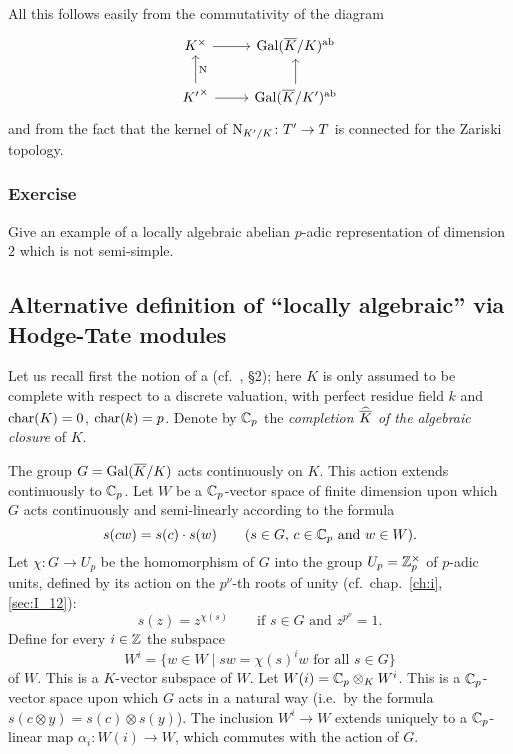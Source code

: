All this follows easily from the commutativity of the diagram
\dpage
\[\begin{tikzcd}
	{K^\times} & {\abcl{\Gal(\algcl K/K)}} \\
	{{K'}^\times} & {\abcl{\Gal(\algcl K/K')}}
	\arrow[from=1-1, to=1-2]
	\arrow["\Nm"', from=2-1, to=1-1]
	\arrow[from=2-1, to=2-2]
	\arrow[from=2-2, to=1-2]
\end{tikzcd}\]
and from the fact that the kernel of $\operatorname{N}_{K'/K} \colon T' \to T$ is connected
for the Zariski topology.

\subsubsection*{Exercise}
Give an example of a locally algebraic abelian $p$-adic representation of
dimension $2$ which is not semi-simple.

\subsection{Alternative definition of ``locally algebraic'' via Hodge-Tate
modules}
\label{sec:III_12}
Let us recall first the notion of a  (cf.\ \cite{27},
\S 2); here $K$ is only assumed to be complete with respect to a discrete
valuation, with perfect residue field $k$ and $\operatorname{char}(K) = 0$, $\operatorname{char}(k) = p$.
Denote by $\mathbb{C}_p$ the \emph{completion $\widehat{\overline{K}}$ of the algebraic
closure} of $K$.

The group $G = \operatorname{Gal}(\overline{K}/K)$ acts continuously on $K$. This action extends
continuously to $\mathbb{C}_p$. Let $W$ be a $\mathbb{C}_p$-vector space of finite dimension upon
which $G$ acts continuously and semi-linearly according to the formula
\[
	s(cw) = s(c) \cdot s(w) \qquad
	(s \in G, \, c \in \mathbb{C}_p \text{ and } w \in W).
\]
Let $\chi\colon G \to U_p$ be the homomorphism of $G$ into the group $U_p =
\mathbb{Z}_p^\times$ of $p$-adic units, defined by its action on the $p^\nu$-th roots
of unity (cf.\ chap.~\ref{ch:i}, \ref{sec:I_12}):
\dpage
\[
	s(z) = z^{\chi(s)} \qquad \text{if } s \in G \text{ and } z^{p^\nu} = 1.
\]
Define for every $i \in \mathbb{Z}$ the subspace
\[
	W^i = \{ w \in W \mid sw = \chi(s)^i w \text{ for all } s\in G \}
\]
of $W$. This is a $K$-vector subspace of $W$. Let $W(i) = \mathbb{C}_p \otimes_K W^i$.
This is a $\mathbb{C}_p$-vector space upon which $G$ acts in a natural way (i.e.\ by the
formula $s(c \otimes y) = s(c) \otimes s(y)$). The inclusion $W^i \to W$
extends uniquely to a $\mathbb{C}_p$-linear map $\alpha_i\colon W(i) \to W$, which
commutes with the action of $G$.

